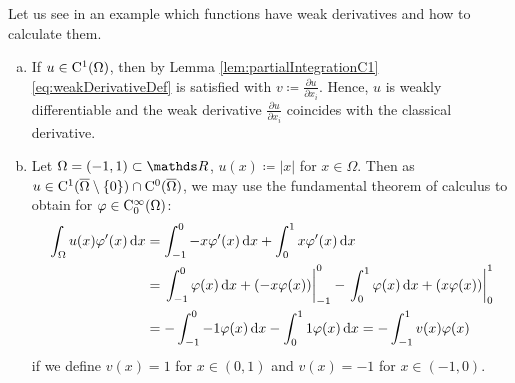 Let us see in an example which functions have weak derivatives and how to calculate them.

\begin{ex} 
\label{ex:weakDerivative}
  \begin{enumerate}[a)]
    \item If $u \in \mathrm{C}^1(\Omega)$, then by Lemma \ref{lem:partialIntegrationC1} \eqref{eq:weakDerivativeDef} is satisfied with $v \coloneqq \frac{\partial u}{\partial x_i}$.
      Hence, $u$ is weakly differentiable and the weak derivative $\frac{\partial u}{\partial x_i}$ coincides with the classical derivative.
    \item Let $\Omega = (-1,1) \subset \R$, $u(x) \coloneqq |x|$ for $x \in \Omega$.
      Then as $u \in \mathrm{C}^1(\overline \Omega \setminus \{0\}) \cap \mathrm{C}^0(\overline \Omega)$, we may use the fundamental theorem of calculus to obtain for $\varphi \in \mathrm{C}_0^\infty(\Omega)$:
      \begin{align*}
        \int_\Omega u(x) \varphi^\prime(x) \, {\operatorname{d}\!{x}} 
        &= \int_{-1}^0 -x \varphi^\prime(x) \, {\operatorname{d}\!{x}} + \int_0^1 x \varphi^\prime(x) \, {\operatorname{d}\!{x}} \\
        &= \left.\int_{-1}^0 \varphi(x) \, {\operatorname{d}\!{x}} + (-x \varphi(x))\right|_{-1}^0 - \left.\int_0^1 \varphi(x) \, {\operatorname{d}\!{x}} + (x \varphi(x))\right|_0^1 \\
        &= -\int_{-1}^0 -1 \varphi(x) \, {\operatorname{d}\!{x}} - \int_0^1 1 \varphi(x) \, {\operatorname{d}\!{x}}
        = -\int_{-1}^1 v(x) \varphi(x)
      \end{align*}
  if we define $v(x) = 1$ for $x \in (0,1)$ and $v(x) = -1$ for  $x \in (-1,0)$.


\end{enumerate}
\end{ex}
